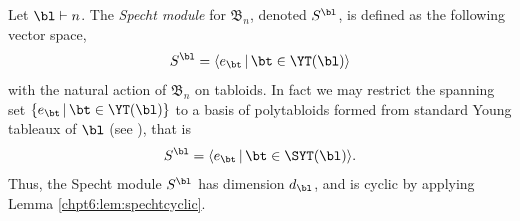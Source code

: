 \documentclass[11pt]{report}
\begin{document}
\begin{defn}
	Let $\bl \vdash n$. The \emph{Specht module} for $\mathfrak{B}_{n}$, denoted $S^{\bl}$, is defined as the following vector space,
	\[S^{\bl} = \langle e_{\bt} \, | \, \bt \in \YT(\bl) \rangle \]
	with the natural action of $\mathfrak{B}_{n}$ on tabloids. 	In fact we may restrict the spanning set $\{ e_{\bt} \, | \, \bt \in \YT(\bl) \}$ to a basis of polytabloids formed from standard Young tableaux of $\bl$ (see \cite[Sections 4 and 5]{can1996representations}), that is
	\begin{eqnarray}
	S^{\bl} = \langle e_{\bt} \, | \, \bt \in \SYT(\bl) \rangle.
	\end{eqnarray}
	Thus, the Specht module $S^{\bl}$ has dimension $d_{\bl}$, and is cyclic by applying Lemma \ref{chpt6:lem:spechtcyclic}.
\end{defn}
\end{document}
